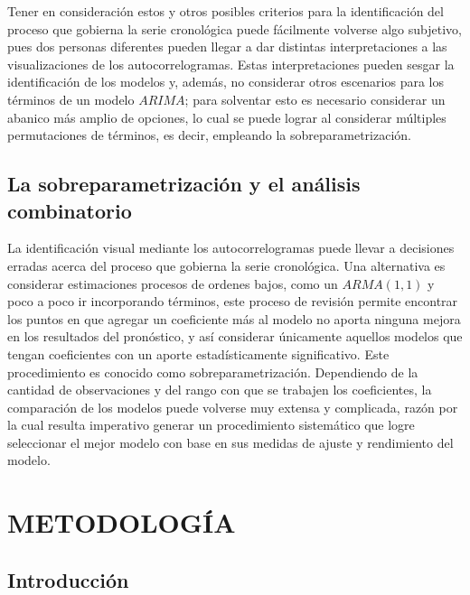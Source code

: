 \documentclass[
]{article}
\begin{document}
Tener en consideración estos y otros posibles criterios para la
identificación del proceso que gobierna la serie cronológica puede
fácilmente volverse algo subjetivo, pues dos personas diferentes pueden
llegar a dar distintas interpretaciones a las visualizaciones de los
autocorrelogramas. Estas interpretaciones pueden sesgar la
identificación de los modelos y, además, no considerar otros escenarios
para los términos de un modelo \(ARIMA\); para solventar esto es
necesario considerar un abanico más amplio de opciones, lo cual se puede
lograr al considerar múltiples permutaciones de términos, es decir,
empleando la sobreparametrización.

\subsection{La sobreparametrización y el análisis combinatorio}

La identificación visual mediante los autocorrelogramas puede llevar a
decisiones erradas acerca del proceso que gobierna la serie cronológica.
Una alternativa es considerar estimaciones procesos de ordenes bajos,
como un \(ARMA(1,1)\) y poco a poco ir incorporando términos, este
proceso de revisión permite encontrar los puntos en que agregar un
coeficiente más al modelo no aporta ninguna mejora en los resultados del
pronóstico, y así considerar únicamente aquellos modelos que tengan
coeficientes con un aporte estadísticamente significativo. Este
procedimiento es conocido como sobreparametrización. Dependiendo de la
cantidad de observaciones y del rango con que se trabajen los
coeficientes, la comparación de los modelos puede volverse muy extensa y
complicada, razón por la cual resulta imperativo generar un
procedimiento sistemático que logre seleccionar el mejor modelo con base
en sus medidas de ajuste y rendimiento del modelo.

\newpage

\section{METODOLOGÍA}

\subsection{Introducción}
\end{document}

